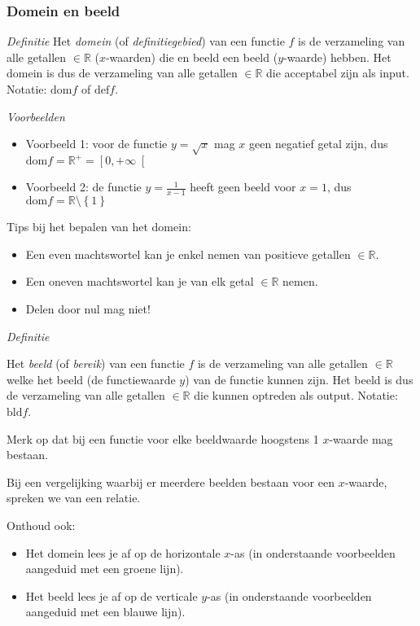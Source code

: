 \subsubsection{Domein en beeld}

\emph{Definitie}
\noindent Het \emph{domein} (of \emph{definitiegebied}) van een functie
$f$ is de verzameling van alle getallen $\in \mathbb{R}$ ($x$-waarden) die en beeld
een beeld ($y$-waarde) hebben. Het domein is dus de
verzameling van alle getallen $\in \mathbb{R}$ die acceptabel zijn als input.
Notatie: $\textrm{dom}f$ of $\textrm{def}f$.

\medskip{}

\emph{Voorbeelden}
\begin{itemize}
\item Voorbeeld 1: voor de functie $y=\sqrt{x}$ mag $x$ geen
negatief getal zijn, dus $\textrm{dom}f=\mathbb{R}^{+}=\left[0,+\infty\right[$

\item Voorbeeld 2: de functie $y=\frac{1}{x-1}$ heeft geen beeld
voor $x=1$, dus $\textrm{dom}f=\mathbb{R}\setminus\left\{ 1\right\} $

\end{itemize}

Tips bij het bepalen van het domein:
\begin{itemize}
\item Een even machtswortel kan je enkel nemen van positieve getallen $\in \mathbb{R}$.
\item Een oneven machtswortel kan je van elk getal $\in \mathbb{R}$ nemen.
\item Delen door nul mag niet!
\end{itemize}

\bigskip{}

\emph{Definitie}

\noindent Het \emph{beeld} (of \emph{bereik}) van een functie $f$
is de verzameling van alle getallen $\in \mathbb{R}$ welke het beeld (de functiewaarde
$y$) van de functie kunnen zijn. Het beeld is dus de verzameling
van alle getallen $\in \mathbb{R}$ die kunnen optreden als output. Notatie: $\textrm{bld}f$.

\medskip{}

Merk op dat bij een functie voor elke beeldwaarde hoogstens 1 $x$-waarde mag bestaan.

Bij een vergelijking waarbij er meerdere beelden bestaan voor een $x$-waarde, spreken we van een relatie.

Onthoud ook:
\begin{itemize}
\item Het domein lees je af op de horizontale $x$-as (in onderstaande voorbeelden aangeduid met een groene lijn).
\item Het beeld lees je af op de verticale $y$-as (in onderstaande voorbeelden aangeduid met een blauwe lijn).
\end{itemize}


